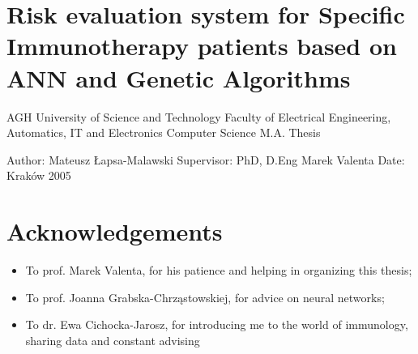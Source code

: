 \documentclass[10pt,oneside]{memoir}
\date{2005}
\title{\mytitle}
\author{\myauthor}
\def\mychapterstyle{default}
\def\mypagestyle{headings}
\def\revision{}
\begin{document}
\chapterstyle{\mychapterstyle}
\pagestyle{\mypagestyle}

%
%

\frontmatter



\maketitle
\clearpage

\vspace*{\fill}

\setlength{\parindent}{0pt}

\ifx\mycopyright\undefined
\else
	\textcopyright{} \mycopyright
\fi

\revision

\begin{center}
\end{center}

\setlength{\parindent}{1em}
\clearpage

\tableofcontents


%
%


\setlength{\parindent}{1em}

\mainmatter
\part{Risk evaluation system for Specific Immunotherapy patients based on ANN and Genetic Algorithms}
\label{specificimmunotherapypatientsriskevaluationsystembasedonannandgeneticalgorithms}

AGH University of Science and Technology
Faculty of Electrical Engineering, Automatics, IT and Electronics
Computer Science
M.A. Thesis


Author: Mateusz Łapsa-Malawski
Supervisor: PhD, D.Eng Marek Valenta
Date: Kraków 2005


\part{Acknowledgements}
\label{acknowledgements}

\begin{itemize}


\item To prof. Marek Valenta, for his patience and helping in organizing this thesis;

\item To prof. Joanna Grabska-Chrząstowskiej, for advice on neural networks;

\item To dr. Ewa Cichocka-Jarosz, for introducing me to the world of immunology, sharing data and constant advising
\end{itemize}
\end{document}
